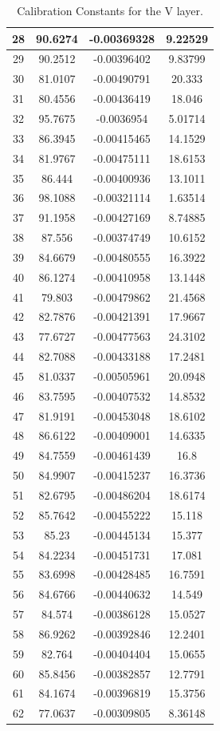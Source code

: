 \begin{table}[h]
{\begin{tabular}{|c|c|c|c|}
28 & 90.6274 & -0.00369328 & 9.22529 \\ \hline 
29 & 90.2512 & -0.00396402 & 9.83799 \\ \hline 
30 & 81.0107 & -0.00490791 & 20.333 \\ \hline 
31 & 80.4556 & -0.00436419 & 18.046 \\ \hline 
32 & 95.7675 & -0.0036954 & 5.01714 \\ \hline 
33 & 86.3945 & -0.00415465 & 14.1529 \\ \hline 
34 & 81.9767 & -0.00475111 & 18.6153 \\ \hline 
35 & 86.444 & -0.00400936 & 13.1011 \\ \hline 
36 & 98.1088 & -0.00321114 & 1.63514 \\ \hline 
37 & 91.1958 & -0.00427169 & 8.74885 \\ \hline 
38 & 87.556 & -0.00374749 & 10.6152 \\ \hline 
39 & 84.6679 & -0.00480555 & 16.3922 \\ \hline 
40 & 86.1274 & -0.00410958 & 13.1448 \\ \hline 
41 & 79.803 & -0.00479862 & 21.4568 \\ \hline 
42 & 82.7876 & -0.00421391 & 17.9667 \\ \hline 
43 & 77.6727 & -0.00477563 & 24.3102 \\ \hline 
44 & 82.7088 & -0.00433188 & 17.2481 \\ \hline 
45 & 81.0337 & -0.00505961 & 20.0948 \\ \hline 
46 & 83.7595 & -0.00407532 & 14.8532 \\ \hline 
47 & 81.9191 & -0.00453048 & 18.6102 \\ \hline 
48 & 86.6122 & -0.00409001 & 14.6335 \\ \hline 
49 & 84.7559 & -0.00461439 & 16.8 \\ \hline 
50 & 84.9907 & -0.00415237 & 16.3736 \\ \hline 
51 & 82.6795 & -0.00486204 & 18.6174 \\ \hline 
52 & 85.7642 & -0.00455222 & 15.118 \\ \hline 
53 & 85.23 & -0.00445134 & 15.377 \\ \hline 
54 & 84.2234 & -0.00451731 & 17.081 \\ \hline 
55 & 83.6998 & -0.00428485 & 16.7591 \\ \hline 
56 & 84.6766 & -0.00440632 & 14.549 \\ \hline 
57 & 84.574 & -0.00386128 & 15.0527 \\ \hline 
58 & 86.9262 & -0.00392846 & 12.2401 \\ \hline 
59 & 82.764 & -0.00404404 & 15.0655 \\ \hline 
60 & 85.8456 & -0.00382857 & 12.7791 \\ \hline 
61 & 84.1674 & -0.00396819 & 15.3756 \\ \hline 
62 & 77.0637 & -0.00309805 & 8.36148 \\ \hline 
        \end{tabular}
        }
        \caption{Calibration Constants for the V layer.}
        \label{tab:VattenCSimulation}
\end{table}

